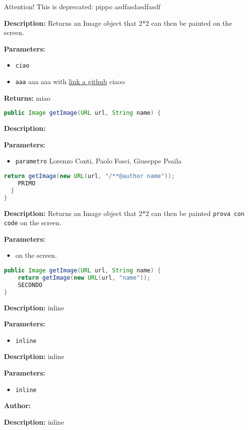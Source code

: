 Attention! This is deprecated: pippo asdfasdasdfasdf

\textbf{Description:}
 Returns an Image object that 2*2 can then be painted on the screen. 

\textbf{Parameters:}
\begin{itemize}
  \item\texttt{ciao} 
  \item\texttt{aaa} aaa aaa with \href{https://github.com/test}{link a github}  ciaoo
\end{itemize}

\textbf{Returns:}
miao

\begin{lstlisting}[language=Java]
public Image getImage(URL url, String name) {
\end{lstlisting}
\textbf{Description:}
 

\textbf{Parameters:}
\begin{itemize}
  \item\texttt{parametro} Lorenzo Conti, Paolo Fosci, Giuseppe Psaila
\end{itemize}

\begin{lstlisting}[language=Java]
    return getImage(new URL(url, "/**@author name"));
    PRIMO
  }
}
\end{lstlisting}
\textbf{Description:}
Returns an Image object that 2*2 can then be painted \texttt{prova con code} on the screen.

\textbf{Parameters:}
\begin{itemize}
  \item\texttt{} on the screen.
\end{itemize}

\begin{lstlisting}[language=Java]
public Image getImage(URL url, String name) {
    return getImage(new URL(url, "name"));
    SECONDO
}
\end{lstlisting}
\textbf{Description:}
inline

\textbf{Parameters:}
\begin{itemize}
  \item\texttt{inline} 
\end{itemize}

\textbf{Description:}
inline

\textbf{Parameters:}
\begin{itemize}
  \item\texttt{inline} 
\end{itemize}

\textbf{Author:} 

\textbf{Description:}
 inline 

